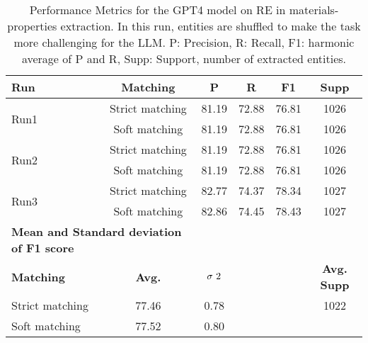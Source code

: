 \begin{table}[htbp]
    \small
    \centering
    \caption{Performance Metrics for the GPT4 model on RE in materials-properties extraction. In this run, entities are shuffled to make the task more challenging for the LLM. P: Precision, R: Recall, F1: harmonic average of P and R, Supp: Support, number of extracted entities.}
    \begin{tabular}{lccccc}
        \toprule
        \textbf{Run} & \textbf{Matching} & \textbf{P} & \textbf{R} & \textbf{F1} & \textbf{Supp} \\
        \midrule
        \multirow{2}{*}{Run1} & Strict matching & 81.19 & 72.88 & 76.81 & 1026 \\
        & Soft matching & 81.19 & 72.88 & 76.81 & 1026 \\
        \midrule
        \multirow{2}{*}{Run2} & Strict matching & 81.19 & 72.88 & 76.81 & 1026 \\
        & Soft matching & 81.19 & 72.88 & 76.81 & 1026 \\
        \midrule
        \multirow{2}{*}{Run3} & Strict matching & 82.77 & 74.37 & 78.34 & 1027 \\
        & Soft matching & 82.86 & 74.45 & 78.43 & 1027 \\
        \midrule
        \multicolumn{2}{l}{\textbf{Mean and Standard deviation of F1 score}} & & & & \\
        \midrule
        \textbf{Matching} & \textbf{Avg.} & $\sigma\textsuperscript{2}$ & & & \textbf{Avg. Supp}\\
        Strict matching & 77.46 & 0.78 & & & 1022 \\
        Soft matching & 77.52 & 0.80 & & \\
        \bottomrule
    \end{tabular}
\end{table}


